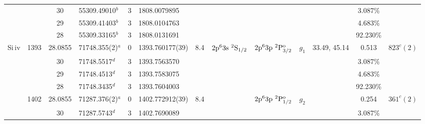 \begin{table*}
\begin{center}
{\begin{tabular}{:l;l;c;l;c;l;c;l;l;c;c;c;c}
\rowstyle{\itshape}               &        & 30        & 55309.49010$^{b}$                & 3 &  1808.0079895      &      & $                                        $ & $                                        $ & $      $ &              & 3.087\%   & $     ^{}     $\\
\rowstyle{\itshape}               &        & 29        & 55309.41403$^{b}$                & 3 &  1808.0104763      &      & $                                        $ & $                                        $ & $      $ &              & 4.683\%   & $     ^{}     $\\
\rowstyle{\itshape}               &        & 28        & 55309.33165$^{b}$                & 3 &  1808.0131691      &      & $                                        $ & $                                        $ & $      $ &              & 92.230\%  & $     ^{}     $\\
                    Si{\sc \,iv}  & 1393   & 28.0855   & 71748.355(2)$^{a}$               & 0 &   1393.760177(39)  &  8.4 & $2\rm{p}^63\rm{s}~^2\rm{S}_{1/2}         $ & $2\rm{p}^63\rm{p}~^2\rm{P}_{3/2}^{\rm o} $ & $g_{1} $ & 33.49, 45.14 & 0.513     & $  823^{c}(2)  $\\
\rowstyle{\itshape}               &        & 30        & 71748.5517$^{d}$                 & 3 &  1393.7563570      &      & $                                        $ & $                                        $ & $      $ &              & 3.087\%   & $     ^{}     $\\
\rowstyle{\itshape}               &        & 29        & 71748.4513$^{d}$                 & 3 &  1393.7583075      &      & $                                        $ & $                                        $ & $      $ &              & 4.683\%   & $     ^{}     $\\
\rowstyle{\itshape}               &        & 28        & 71748.3435$^{d}$                 & 3 &  1393.7604003      &      & $                                        $ & $                                        $ & $      $ &              & 92.230\%  & $     ^{}     $\\
                                  & 1402   & 28.0855   & 71287.376(2)$^{a}$               & 0 &   1402.772912(39)  &  8.4 & $                                        $ & $2\rm{p}^63\rm{p}~^2\rm{P}_{1/2}^{\rm o} $ & $g_{2} $ &              & 0.254     & $  361^{c}(2)  $\\
\rowstyle{\itshape}               &        & 30        & 71287.5743$^{d}$                 & 3 &  1402.7690089      &      & $                                        $ & $                                        $ & $      $ &              & 3.087\%   & $     ^{}     $\\

\end{tabular}}
\end{center}
\end{table*}

